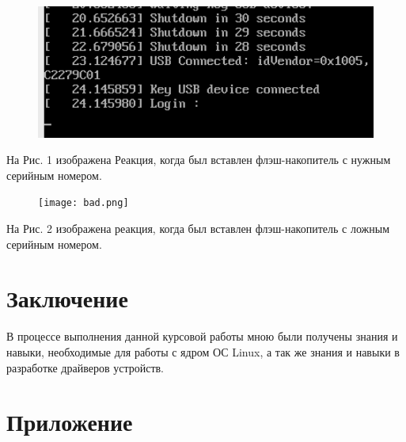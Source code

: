 \documentclass[a4paper]{article}
\begin{document}
\begin{figure}[h!]
\clearpage
\centering
\includegraphics[width=16cm]{ok.png} 
\caption{}
\end{figure}

На Рис. 1 изображена Реакция, когда был вставлен флэш-накопитель с нужным серийным номером.

\begin{figure}[h!]
\clearpage
\centering
\texttt{[image: bad.png]} 
\caption{}
\end{figure} 

На Рис. 2 изображена реакция, когда был вставлен флэш-накопитель с ложным серийным номером.

\section{Заключение}

В процессе выполнения данной курсовой работы мною были получены знания и навыки, необходимые для работы с ядром ОС Linux, а так же знания и навыки в разработке драйверов устройств. 

\section{Приложение}
\end{document}
